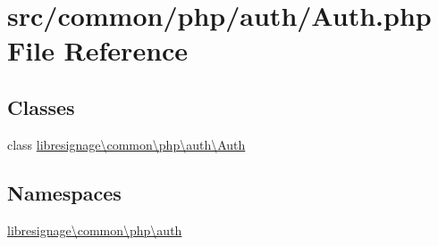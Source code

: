 \hypertarget{Auth_8php}{}\section{src/common/php/auth/\+Auth.php File Reference}
\label{Auth_8php}
\subsection*{Classes}
\begin{DoxyCompactItemize}
\item 
class \hyperlink{classlibresignage_1_1common_1_1php_1_1auth_1_1Auth}{libresignage\textbackslash{}common\textbackslash{}php\textbackslash{}auth\textbackslash{}\+Auth}
\end{DoxyCompactItemize}
\subsection*{Namespaces}
\begin{DoxyCompactItemize}
\item 
 \hyperlink{namespacelibresignage_1_1common_1_1php_1_1auth}{libresignage\textbackslash{}common\textbackslash{}php\textbackslash{}auth}
\end{DoxyCompactItemize}
